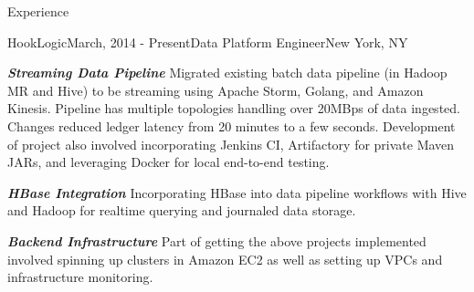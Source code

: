 \documentclass{resume} %
\begin{document}
\begin{rSection}{Experience}

    \begin{rSubsection}{HookLogic}{March, 2014 - Present}{Data Platform Engineer}{New York, NY}
    \item \textbf{\textit{Streaming Data Pipeline}} Migrated existing batch data pipeline (in Hadoop MR and Hive) to be streaming using Apache Storm, Golang, and Amazon Kinesis.  Pipeline has multiple topologies handling over 20MBps of data ingested.  Changes reduced ledger latency from 20 minutes to a few seconds.  Development of project also involved incorporating Jenkins CI, Artifactory for private Maven JARs, and leveraging Docker for local end-to-end testing.
    \item \textbf{\textit{HBase Integration}} Incorporating HBase into data pipeline workflows with Hive and Hadoop for realtime querying and journaled data storage.
    \item \textbf{\textit{Backend Infrastructure}} Part of getting the above projects implemented involved spinning up clusters in Amazon EC2 as well as setting up VPCs and infrastructure monitoring.  
   
    \end{rSubsection}


\end{rSection}
\end{document}
